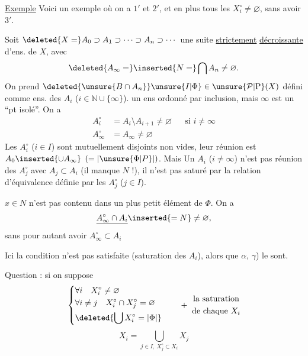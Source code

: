 \uline{Exemple} Voici un exemple où on a $1'$ et $2'$, et en plus tous les $X_i^\circ\ne\varnothing$, sans avoir $3'$. 

Soit $\deleted{X=}A_0\supset A_1\supset\cdots\supset A_n\supset\cdots$ une suite \uline{strictement} \uline{décroissante} d'ens. de $X$, avec
\[
\deleted{A_\infty=}\inserted{N=}\bigcap A_n\ne\varnothing.
\]
On prend $\deleted{\unsure{B\cap A_n}}\unsure{I|\Phi}\in\unsure{\mathcal{P}|\mathrm{P}}(X)$ défini comme ens. des $A_i$ ($i\in\mathbb{N}\cup\{\infty\}$).   un ens  ordonné par inclusion, mais $\infty$ est un ``pt isolé''. On a
\[
\begin{aligned}
A_i^\circ&=A_i\setminus A_{i+1}\ne\varnothing&&\text{si }i\ne\infty\\
A_\infty^\circ&=A_\infty\ne\varnothing
\end{aligned}
\]
 Les $A_i^\circ$ ($i\in I$) sont mutuellement disjoints non vides, leur réunion est $A_0\inserted{\cup A_\infty}$ $(=|\unsure{\Phi|P}|)$. Mais Un $A_i$ ($i\ne\infty$) n'est pas réunion des $A_j^\circ$ avec $A_j\subset A_i$ (il manque $N$ !), il n'est pas saturé par la relation d'équivalence définie par les $A_j^\circ$ ($j\in I$).

  $x\in N$ n'est pas contenu dans un plus petit élément de $\Phi$. On a
\[
\underline{A_\infty^\circ\cap A_i}\inserted{=N}\ne\varnothing,
\]
sans pour autant avoir $A_\infty^\circ\subset A_i$ 

Ici la condition  n'est pas satisfaite (saturation des $A_i$), alors que $\alpha$, $\gamma$) le sont.

Question : si on suppose
\[
\left\{\begin{aligned}
&\forall i\quad X_i^\circ\ne\varnothing\\
&\forall i\ne j\quad X_i^\circ\cap X_j^\circ=\varnothing\\
&\deleted{\bigcup X_i^\circ=|\Phi|}
\end{aligned}\right.
\qquad+\ \begin{gathered}\text{la saturation}\\\text{de chaque }X_i\end{gathered}
\]
\[
X_i=\bigcup_{j\in I,\ X_j^\circ\subset X_i}X_j
\]


